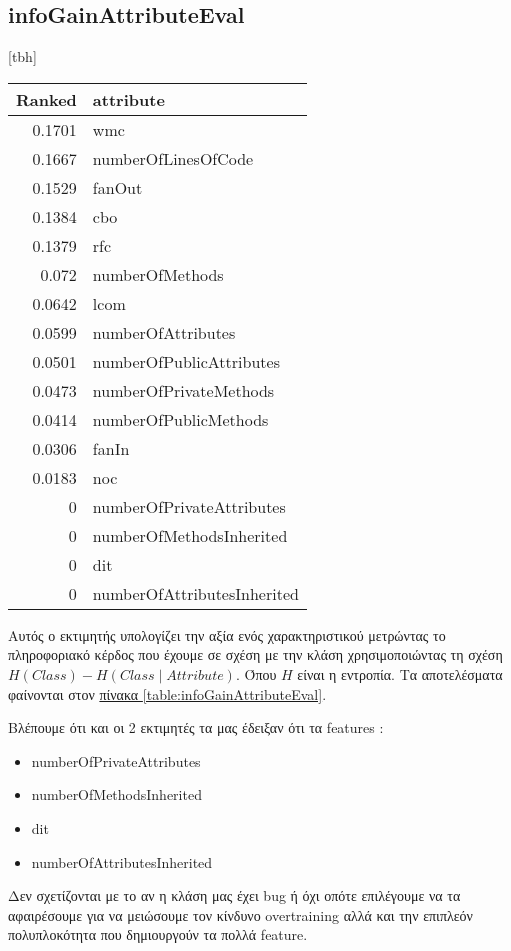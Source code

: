 \subsection{infoGainAttributeΕval}
\begin{minipage}{1.0\textwidth}
\begin{center}[tbh]
\begin{tabular}{r|l}
Ranked & attribute\\
\hline
0.1701 &  wmc\\
0.1667&   numberOfLinesOfCode\\
0.1529&   fanOut\\
0.1384&   cbo\\
0.1379&   rfc\\
0.072 &  numberOfMethods\\
0.0642&   lcom\\
0.0599&   numberOfAttributes\\
0.0501&   numberOfPublicAttributes\\
0.0473&  numberOfPrivateMethods\\
0.0414&   numberOfPublicMethods\\
0.0306&   fanIn\\
0.0183&   noc\\
0      &  numberOfPrivateAttributes\\
0      &  numberOfMethodsInherited\\
0      &  dit\\
0      &  numberOfAttributesInherited\\
\end{tabular}
\label{table:infoGainAttributeΕval}
\end{center}

Αυτός ο εκτιμητής υπολογίζει την αξία ενός χαρακτηριστικού μετρώντας το πληροφοριακό κέρδος που έχουμε σε σχέση με την κλάση χρησιμοποιώντας τη σχέση $H(Class) - H(Class \mid Attribute)$.
Όπου $H$ είναι η εντροπία.
Τα αποτελέσματα φαίνονται στον
\hyperref[table:infoGainAttributeΕval]{πίνακα \ref{table:infoGainAttributeΕval}}.

Βλέπουμε ότι και οι 2 εκτιμητές τα μας έδειξαν ότι τα features :
\begin{itemize}
\bfseries
\item numberOfPrivateAttributes
\item numberOfMethodsInherited
\item dit
\item numberOfAttributesInherited 
\end{itemize}
Δεν σχετίζονται με το αν η κλάση μας έχει bug ή όχι οπότε επιλέγουμε να τα αφαιρέσουμε
για να μειώσουμε τον κίνδυνο overtraining αλλά και την επιπλεόν πολυπλοκότητα που δημιουργούν τα πολλά feature.
\end{minipage}
